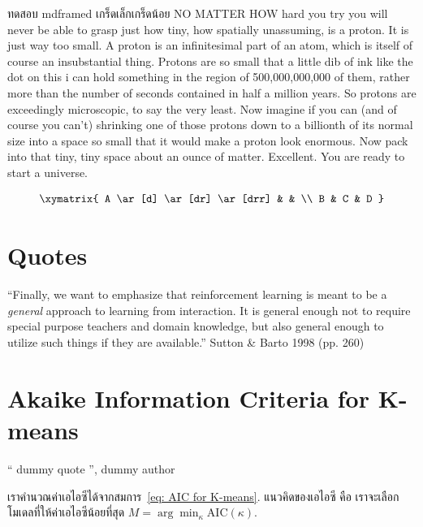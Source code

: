 
\begin{mdframed}[backgroundcolor=yellow]
ทดสอบ mdframed
เกร็ดเล็กเกร็ดน้อย
NO MATTER HOW hard you try you will never be able to grasp just how tiny, how spatially unassuming, is a proton. It is just way too small.
A proton is an infinitesimal part of an atom, which is itself of course an insubstantial thing. Protons are so small that a little dib of ink like the dot on this i can hold something in the region of 500,000,000,000 of them, rather more than the number of seconds contained in half a million years. So protons are exceedingly microscopic, to say the very least.
Now imagine if you can (and of course you can’t) shrinking one of those protons down to a billionth of its normal size into a space so small that it would make a proton look enormous. Now pack into that tiny, tiny space about an ounce of matter. Excellent. You are ready to start a universe.
\end{mdframed}

\begin{displaymath}
    \xymatrix{
        A \ar[d] \ar[dr] \ar[drr] &   &   \\
        B                         & C & D }
\end{displaymath}

\section{Quotes}

``Finally, we want to emphasize that reinforcement learning is meant to be a \textit{general} approach to learning from interaction. It is general enough not to require special purpose teachers and domain knowledge, but also general enough to utilize such things if they are available.'' Sutton \& Barto 1998 (pp. 260)

\section{Akaike Information Criteria for K-means}

`` dummy quote '', dummy author

เราคำนวณค่าเอไอซีได้จากสมการ~\ref{eq: AIC for K-means}.
แนวคิดของเอไอซี คือ เราจะเลือกโมเดลที่ให้ค่าเอไอซีน้อยที่สุด $M = \arg\min_{\kappa} \mathrm{AIC}(\kappa)$.

